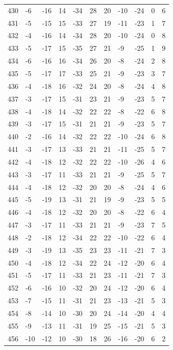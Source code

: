 \begin{table}[H]
\begin{tabular}{lllllllllll}
430 & -6 & -16 & 14 & -34 & 28 & 20 & -10 & -24 & 0 & 6 \\
431 & -5 & -15 & 15 & -33 & 27 & 19 & -11 & -23 & 1 & 7 \\
432 & -4 & -16 & 14 & -34 & 28 & 20 & -10 & -24 & 0 & 8 \\
433 & -5 & -17 & 15 & -35 & 27 & 21 & -9 & -25 & 1 & 9 \\
434 & -6 & -16 & 16 & -34 & 26 & 20 & -8 & -24 & 2 & 8 \\
435 & -5 & -17 & 17 & -33 & 25 & 21 & -9 & -23 & 3 & 7 \\
436 & -4 & -18 & 16 & -32 & 24 & 20 & -8 & -24 & 4 & 8 \\
437 & -3 & -17 & 15 & -31 & 23 & 21 & -9 & -23 & 5 & 7 \\
438 & -4 & -18 & 14 & -32 & 22 & 22 & -8 & -22 & 6 & 8 \\
439 & -3 & -17 & 15 & -31 & 21 & 21 & -9 & -23 & 5 & 7 \\
440 & -2 & -16 & 14 & -32 & 22 & 22 & -10 & -24 & 6 & 8 \\
441 & -3 & -17 & 13 & -33 & 21 & 21 & -11 & -25 & 5 & 7 \\
442 & -4 & -18 & 12 & -32 & 22 & 22 & -10 & -26 & 4 & 6 \\
443 & -3 & -17 & 11 & -33 & 21 & 21 & -9 & -25 & 5 & 7 \\
444 & -4 & -18 & 12 & -32 & 20 & 20 & -8 & -24 & 4 & 6 \\
445 & -5 & -19 & 13 & -31 & 21 & 19 & -9 & -23 & 5 & 5 \\
446 & -4 & -18 & 12 & -32 & 20 & 20 & -8 & -22 & 6 & 4 \\
447 & -3 & -17 & 11 & -33 & 21 & 21 & -9 & -23 & 7 & 5 \\
448 & -2 & -18 & 12 & -34 & 22 & 22 & -10 & -22 & 6 & 4 \\
449 & -3 & -19 & 13 & -35 & 23 & 23 & -11 & -21 & 7 & 3 \\
450 & -4 & -18 & 12 & -34 & 22 & 24 & -12 & -20 & 6 & 4 \\
451 & -5 & -17 & 11 & -33 & 21 & 23 & -11 & -21 & 7 & 3 \\
452 & -6 & -16 & 10 & -32 & 20 & 24 & -12 & -20 & 6 & 4 \\
453 & -7 & -15 & 11 & -31 & 21 & 23 & -13 & -21 & 5 & 3 \\
454 & -8 & -14 & 10 & -30 & 20 & 24 & -14 & -20 & 4 & 4 \\
455 & -9 & -13 & 11 & -31 & 19 & 25 & -15 & -21 & 5 & 3 \\
456 & -10 & -12 & 10 & -30 & 18 & 26 & -16 & -20 & 6 & 2 \\

\end{tabular}
\end{table}
